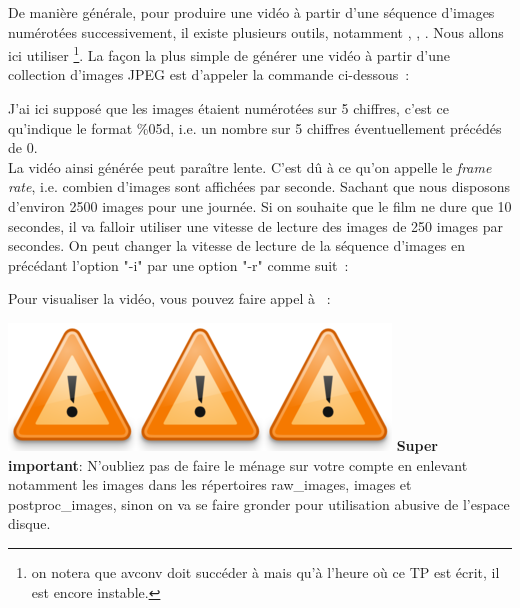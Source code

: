 De manière générale, pour produire une vidéo à partir d'une séquence d'images numérotées successivement, il existe plusieurs outils, notamment \mencoder, \ffmpeg, \avconv. Nous allons ici utiliser \ffmpeg\footnote{on notera que avconv doit succéder à \ffmpeg mais qu'à l'heure o{\`u} ce TP est écrit, il est encore instable.}.  La façon la plus simple de générer une vidéo à partir d'une collection d'images JPEG est d'appeler la commande ci-dessous~:
\begin{center}
\end{center}
J'ai ici supposé que les images étaient numérotées sur 5 chiffres, c'est ce qu'indique le format \%05d, i.e. un nombre sur 5 chiffres éventuellement précédés de 0.\\

La vidéo ainsi générée peut paraître lente. C'est dû à ce qu'on appelle le \emph{frame rate}, i.e. combien d'images sont affichées par seconde. Sachant que nous disposons d'environ 2500 images pour une journée. Si on souhaite que le film ne dure que 10 secondes, il va falloir utiliser une vitesse de lecture des images de 250 images par secondes. On peut changer la vitesse de lecture de la séquence d'images en précédant l'option "-i" par une option "-r" comme suit~:
\begin{center}
\end{center}

Pour visualiser la vidéo, vous pouvez faire appel à \mplayer~:
\begin{center}
\end{center}


\begin{center}
\colorbox{lblue}{\begin{minipage}{\linewidth}
\includegraphics[width=0.05\columnwidth]{Figs/warning.png}\includegraphics[width=0.05\columnwidth]{Figs/warning.png}\includegraphics[width=0.05\columnwidth]{Figs/warning.png}
\textbf{Super important}: N'oubliez pas de faire le ménage sur votre compte en enlevant notamment les images dans les répertoires raw\_images, images et postproc\_images, sinon on va se faire gronder pour utilisation abusive de l'espace disque.
\end{minipage}}
\end{center}

